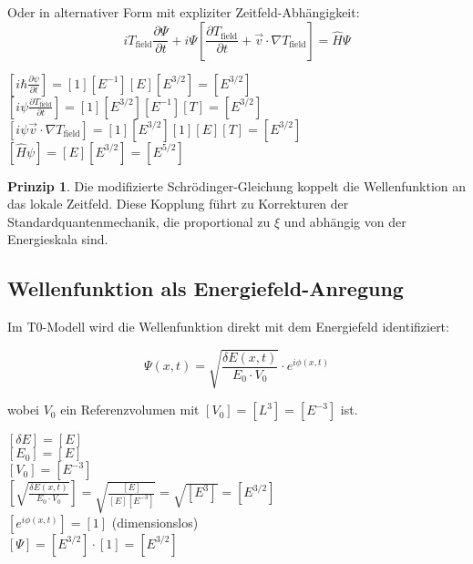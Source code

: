 \documentclass[12pt,a4paper]{article}
\newcommand{\tfield}{T_{\text{field}}}
\newcommand{\dfield}{\delta E}
\theoremstyle{definition}
\newtheorem{prinzip}{Prinzip}
\begin{document}
	Oder in alternativer Form mit expliziter Zeitfeld-Abhängigkeit:
	\begin{equation}
		\boxed{i \tfield \frac{\partial\Psi}{\partial t} + i\Psi\left[\frac{\partial \tfield}{\partial t} + \vec{v} \cdot \nabla \tfield\right] = \hat{H}\Psi}
	\end{equation}
	
	\begin{einheitencheck}
		$[i \hbar \frac{\partial\psi}{\partial t}] = [1][E^{-1}][E][E^{3/2}] = [E^{3/2}]$\\
		$[i\psi\frac{\partial \tfield}{\partial t}] = [1][E^{3/2}][E^{-1}][T] = [E^{3/2}]$\\
		$[i\psi\vec{v} \cdot \nabla \tfield] = [1][E^{3/2}][1][E][T] = [E^{3/2}]$\\
		$[\hat{H}\psi] = [E][E^{3/2}] = [E^{5/2}]$ \checkmark
	\end{einheitencheck}
	
	\begin{prinzip}
		Die modifizierte Schrödinger-Gleichung koppelt die Wellenfunktion an das lokale Zeitfeld. Diese Kopplung führt zu Korrekturen der Standardquantenmechanik, die proportional zu $\xi$ und abhängig von der Energieskala sind.
	\end{prinzip}
	
	\subsection{Wellenfunktion als Energiefeld-Anregung}
	
	Im T0-Modell wird die Wellenfunktion direkt mit dem Energiefeld identifiziert:
	
	\begin{equation}
		\Psi(x,t) = \sqrt{\frac{\dfield(x,t)}{E_0 \cdot V_0}} \cdot e^{i\phi(x,t)}
	\end{equation}
	
	wobei $V_0$ ein Referenzvolumen mit $[V_0] = [L^3] = [E^{-3}]$ ist.
	
	\begin{einheitencheck}
		$[\dfield] = [E]$\\
		$[E_0] = [E]$\\
		$[V_0] = [E^{-3}]$\\
		$[\sqrt{\frac{\dfield(x,t)}{E_0 \cdot V_0}}] = \sqrt{\frac{[E]}{[E][E^{-3}]}} = \sqrt{[E^3]} = [E^{3/2}]$\\
		$[e^{i\phi(x,t)}] = [1]$ (dimensionslos)\\
		$[\Psi] = [E^{3/2}] \cdot [1] = [E^{3/2}]$ \checkmark
	\end{einheitencheck}
	
\end{document}
